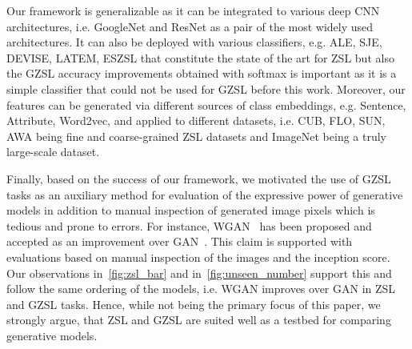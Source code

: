 \documentclass[10pt,twocolumn,letterpaper]{article}
\begin{document}
Our framework is generalizable as it can be integrated to various deep CNN architectures, i.e. GoogleNet and ResNet as a pair of the most widely used architectures. It can also be deployed with various classifiers, e.g. ALE, SJE, DEVISE, LATEM, ESZSL that constitute the state of the art for ZSL but also the GZSL accuracy improvements obtained with softmax is important as it is a simple classifier that could not be used for GZSL before this work. Moreover, our features can be generated via different sources of class embeddings, e.g. Sentence, Attribute, Word2vec, and applied to different datasets, i.e. CUB, FLO, SUN, AWA being fine and coarse-grained ZSL datasets and ImageNet being a truly large-scale dataset.

Finally, based on the success of our framework, we motivated the use of GZSL tasks as an auxiliary method for evaluation of the expressive power of generative models in addition to manual inspection of generated image pixels which is tedious and prone to errors. For instance, WGAN~\cite{gulrajani2017improved} has been proposed and accepted as an improvement over GAN~\cite{GPMXWDOCB14}. This claim is supported with evaluations based on manual inspection of the images and the inception score. Our observations in~\autoref{fig:zsl_bar} and in~\autoref{fig:unseen_number} support this and follow the same ordering of the models, i.e. WGAN improves over GAN in ZSL and GZSL tasks. Hence, while not being the primary focus of this paper, we strongly argue, that ZSL and GZSL are suited well as a testbed for comparing generative models.





{\small


}









 
\end{document}
